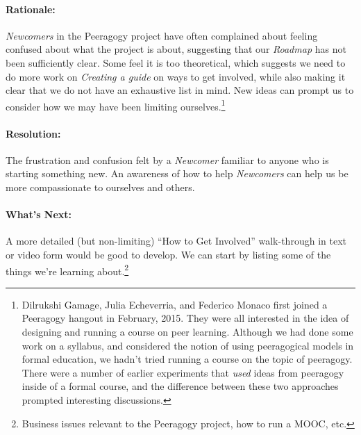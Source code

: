 \paragraph{Rationale:} \emph{Newcomers} in the Peeragogy project have often complained
about feeling confused about what the project is about, suggesting that our \emph{Roadmap}
has not been sufficiently clear.  Some feel it is too theoretical, which suggests
we need to do more work on \emph{Creating a guide} on ways to get involved, while also
making it clear that we do not have an exhaustive list in mind.  New ideas can prompt us to consider how we may have been limiting ourselves.\footnote{Dilrukshi Gamage, Julia Echeverria, and Federico Monaco first joined a Peeragogy hangout in February, 2015.  They were all interested in the idea of designing and running a course on peer learning.  Although we had done some work on a syllabus, and considered the notion of using peeragogical models in formal education, we hadn't tried running a course on the topic of peeragogy.  There were a number of earlier experiments that \emph{used} ideas from peeragogy inside of a formal course, and the difference between these two approaches prompted interesting discussions.}

\paragraph{Resolution:}
The frustration and confusion felt by a \emph{Newcomer} familiar to anyone who is starting something new.  An awareness of how to help \emph{Newcomers} can help us be more compassionate to ourselves and others.

\paragraph{What's Next:} A more detailed (but non-limiting) ``How to Get Involved'' walk-through in text or video form would be good to develop. We can start by listing some of the things we're learning about.\footnote{Business issues relevant to the Peeragogy project, how to run a MOOC, etc.}
